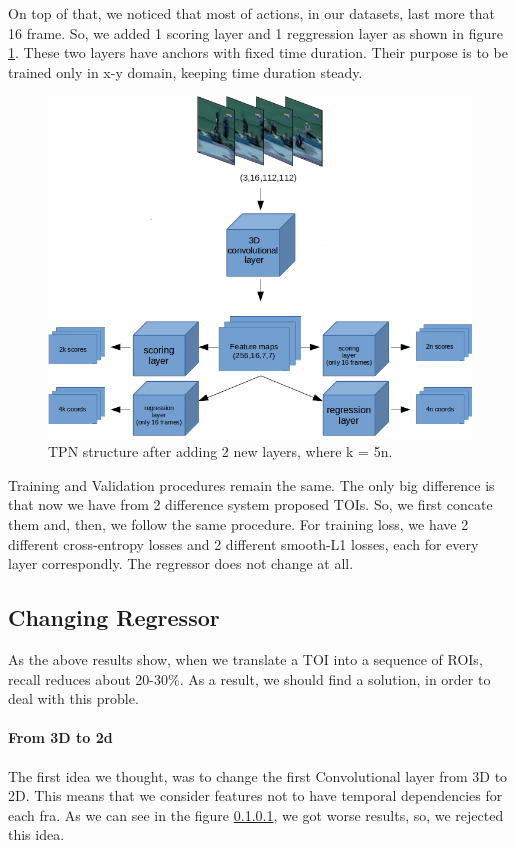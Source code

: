 \documentclass{report}
\begin{document}
On top of that, we noticed that most of actions, in our datasets, last more that 16 frame. So, we added 1 scoring layer and 1 reggression layer as shown in 
figure \ref{fig:tpn_1_2}. These two layers have anchors with fixed time duration. Their purpose is to be trained only in x-y domain, keeping time duration
steady. 
\begin{figure}[h]
  \centering
  \includegraphics[scale=0.5]{tpn_1_2}
  \caption{TPN structure after adding 2 new layers, where k = 5n.}
  \label{fig:tpn_1_2}
\end{figure}

Training and Validation procedures remain the same. The only big difference is that now we have from 2 difference system proposed TOIs. So, we first concate
them and, then, we follow the same procedure. For training loss, we have 2 different cross-entropy losses and 2 different smooth-L1 losses, each for every
layer correspondly. The regressor does not change at all.

\subsection{Changing Regressor}
As the above results show, when we translate a TOI into a sequence of ROIs, recall reduces about 20-30\%. As a result, we should find a solution, in order to
deal with this proble.
\paragraph{From 3D to 2d}
The first idea we thought, was to change the first Convolutional layer from 3D to 2D. This means that we consider  features  not to have temporal dependencies for
each fra. As we can see in the figure \ref{}, we got worse results, so, we rejected this idea.
\end{document}
